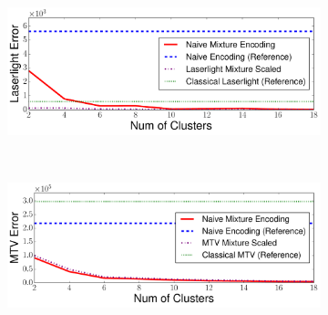 \begin{figure}[h!]
	\captionsetup[subfigure]{justification=centering}
    \centering
    \begin{subfigure}[b]{0.47\textwidth}
        \centering       
        \includegraphics[width=\textwidth]{QueryLogSummarization/graphics/Laserlight_Errors_vs_NumOfClusters.pdf}
       \label{fig:LaserlightMixture_Errors_vs_NumOfClusters}
\end{subfigure}
    ~
\begin{subfigure}[b]{0.47\textwidth}
  \centering       
  \includegraphics[width=\textwidth]{QueryLogSummarization/graphics/MTV_Error_vs_NumOfClusters.pdf}
 \label{fig:MTVMixture_vs_Laserlight_runningTimes_IncomeData}
\end{subfigure}
~
\label{fig:Naive Mixture Encoding_vs_Laserlight&MTV_Mixture}
\trimfigurewhitespace
\end{figure}
